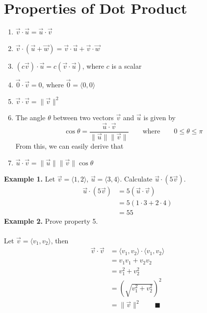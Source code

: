 \documentclass{report}
\begin{document}
\section*{Properties of Dot Product}
\begin{enumerate}[leftmargin=*]
    \item $\vec{v} \cdot \vec{u} = \vec{u} \cdot \vec{v}$
    \item $\vec{v} \cdot (\vec{u} + \vec{w}) = \vec{v} \cdot \vec{u} + \vec{v} \cdot \vec{w}$
    \item $(c\vec{v}) \cdot \vec{u} = c(\vec{v} \cdot \vec{u})$, where $c$ is a scalar
    \item $\vec{0}\cdot\vec{v} = 0$, where $\vec{0} = \langle 0, 0 \rangle$
    \item $\vec{v} \cdot \vec{v} = \lVert \vec{v} \rVert^2$
    \item The angle $\theta$ between two vectors $\vec{v}$ and $\vec{u}$ is given by \[\cos\theta = \frac{\vec{u} \cdot \vec{v}}{\lVert \vec{u} \rVert \lVert \vec{v} \rVert} \qquad \text{where} \qquad 0 \leq \theta \leq \pi\]
          From this, we can easily derive that
    \item $\vec{u} \cdot \vec{v} = \lVert \vec{u} \rVert \lVert \vec{v} \rVert \cos\theta$
\end{enumerate}
\noindent\textbf{Example 1. } Let $\vec{v} = \langle 1, 2 \rangle$, $\vec{u} = \langle 3, 4 \rangle$. Calculate $\vec{u} \cdot (5\vec{v})$.
\begin{align*}
    \vec{u} \cdot (5\vec{v}) & = 5(\vec{u} \cdot \vec{v}) \\
                             & = 5(1 \cdot 3 + 2 \cdot 4) \\
                             & = 55
\end{align*}
\noindent\textbf{Example 2. } Prove property 5.
\\\\
\noindent Let $\vec{v} = \langle v_1, v_2 \rangle$, then
\begin{align*}
    \vec{v} \cdot \vec{v} & = \langle v_1, v_2 \rangle \cdot \langle v_1, v_2 \rangle \\
                          & = v_1v_1 + v_2v_2                                         \\
                          & = v_1^2 + v_2^2                                           \\
                          & = \left(\sqrt{v_1^2 + v_2^2}\right)^2                     \\
                          & = \lVert \vec{v} \rVert^2 \qquad \blacksquare
\end{align*}
\end{document}

